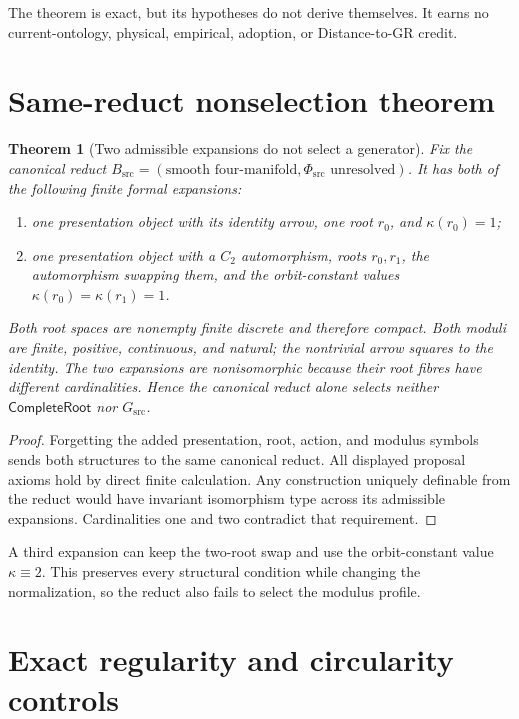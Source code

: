 \documentclass[11pt]{article}
\newtheorem{theorem}{Theorem}
\newcommand{\GSrc}{G_{\mathrm{src}}}
\begin{document}
The theorem is exact, but its hypotheses do not derive themselves.  It earns
no current-ontology, physical, empirical, adoption, or Distance-to-GR credit.

\section{Same-reduct nonselection theorem}

\begin{theorem}[Two admissible expansions do not select a generator]
Fix the canonical reduct
\(B_{\mathrm{src}}=(\text{smooth four-manifold},\Phi_{\mathrm{src}}
\text{ unresolved})\).  It has both of the following finite formal
expansions:
\begin{enumerate}
  \item one presentation object with its identity arrow, one root \(r_0\),
  and \(\kappa(r_0)=1\);
  \item one presentation object with a \(C_2\) automorphism, roots
  \(r_0,r_1\), the automorphism swapping them, and the orbit-constant values
  \(\kappa(r_0)=\kappa(r_1)=1\).
\end{enumerate}
Both root spaces are nonempty finite discrete and therefore compact.  Both
moduli are finite, positive, continuous, and natural; the nontrivial arrow
squares to the identity.  The two expansions are nonisomorphic because their
root fibres have different cardinalities.  Hence the canonical reduct alone
selects neither \(\mathsf{CompleteRoot}\) nor \(\GSrc\).
\end{theorem}

\begin{proof}
Forgetting the added presentation, root, action, and modulus symbols sends
both structures to the same canonical reduct.  All displayed proposal axioms
hold by direct finite calculation.  Any construction uniquely definable from
the reduct would have invariant isomorphism type across its admissible
expansions.  Cardinalities one and two contradict that requirement.
\end{proof}

A third expansion can keep the two-root swap and use the orbit-constant value
\(\kappa\equiv2\).  This preserves every structural condition while changing
the normalization, so the reduct also fails to select the modulus profile.

\section{Exact regularity and circularity controls}
\end{document}
